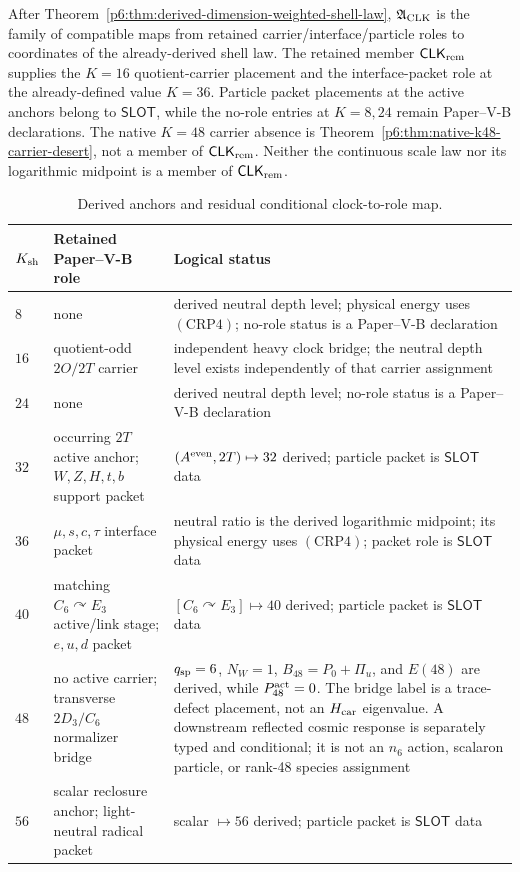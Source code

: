 \documentclass[12pt,a4paper]{article}
\newcommand{\CLKrem}{\mathsf{CLK}_{\rm rem}}
\begin{document}
\begin{definition}
\label{p6:def:complete-clock-bridge}
After Theorem~\ref{p6:thm:derived-dimension-weighted-shell-law},
\(\mathfrak A_{\rm CLK}\) is the family of compatible maps from retained
carrier/interface/particle roles to coordinates of the already-derived shell
law.  The retained member \(\CLKrem\) supplies the \(K=16\) quotient-carrier
placement and the interface-packet role at the already-defined value \(K=36\).
Particle packet placements at the active anchors belong to \(\mathsf{SLOT}\),
while the no-role entries at \(K=8,24\) remain Paper--V-B declarations.  The
native \(K=48\) carrier absence is
Theorem~\ref{p6:thm:native-k48-carrier-desert}, not a member of \(\CLKrem\).
Neither the continuous scale law nor its logarithmic midpoint is a member of
\(\CLKrem\).
\end{definition}

\begin{table}[H]
\centering
\caption{Derived anchors and residual conditional clock-to-role map.}
\label{p6:tab:clock-map}
\small
\renewcommand{\arraystretch}{1.10}
\begin{tabularx}{\textwidth}{@{}L{0.18\textwidth}L{0.27\textwidth}Y@{}}
\toprule
\(K_{\rm sh}\) & Retained Paper--V-B role & Logical status \\
\midrule
\(8\) & none & derived neutral depth level; physical energy uses \((\mathrm{CRP4})\); no-role status is a Paper--V-B declaration \\
\(16\) & quotient-odd \(2O/2T\) carrier & independent heavy clock bridge;
the neutral depth level exists independently of that carrier assignment \\
\(24\) & none & derived neutral depth level; no-role status is a Paper--V-B declaration \\
\(32\) & occurring \(2T\) active anchor; \(W,Z,H,t,b\) support packet
& \((A^{\rm even},2T)\mapsto32\) derived; particle packet is \(\mathsf{SLOT}\) data \\
\(36\) & \(\mu,s,c,\tau\) interface packet
& neutral ratio is the derived logarithmic midpoint; its physical energy uses
\((\mathrm{CRP4})\); packet role is \(\mathsf{SLOT}\) data \\
\(40\) & matching \(C_6\curvearrowright E_3\) active/link stage; \(e,u,d\) packet
& \([C_6\curvearrowright E_3]\mapsto40\) derived; particle packet is \(\mathsf{SLOT}\) data \\
\(48\) & no active carrier; transverse \(2D_3/C_6\) normalizer bridge
& \(q_{\rm sp}=6\), \(N_W=1\), \(B_{48}=P_0+\Pi_u\), and \(E(48)\) are
derived, while \(P_{48}^{\rm act}=0\).  The bridge label is a trace-defect
placement, not an \(H_{\rm car}\) eigenvalue.  A downstream reflected cosmic response is separately
typed and conditional; it is not an \(n_6\) action, scalaron particle, or
rank-48 species assignment \\
\(56\) & scalar reclosure anchor; light-neutral radical packet
& scalar \(\mapsto56\) derived; particle packet is \(\mathsf{SLOT}\) data \\
\bottomrule
\end{tabularx}
\end{table}
\end{document}
